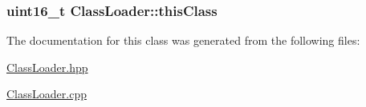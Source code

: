 \subsubsection[{\texorpdfstring{this\+Class}{thisClass}}]{\setlength{\rightskip}{0pt plus 5cm}uint16\+\_\+t Class\+Loader\+::this\+Class\hspace{0.3cm}{\ttfamily [private]}}\hypertarget{class_class_loader_ab4ec421aef6d619f8e2ae86ea08d62f2}{}\label{class_class_loader_ab4ec421aef6d619f8e2ae86ea08d62f2}


The documentation for this class was generated from the following files\+:\begin{DoxyCompactItemize}
\item 
\hyperlink{_class_loader_8hpp}{Class\+Loader.\+hpp}\item 
\hyperlink{_class_loader_8cpp}{Class\+Loader.\+cpp}\end{DoxyCompactItemize}
